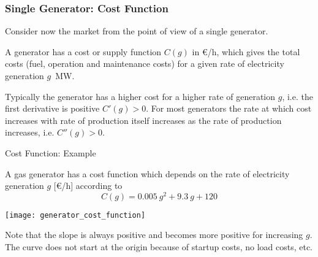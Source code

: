 \documentclass[10pt,aspectratio=169,dvipsnames]{beamer}
\begin{document}
\begin{frame}
  \frametitle{Single Generator: Cost Function}

  Consider now the market from the point of view of a single generator.

  A generator has a \alert{cost or supply function} $C(g)$ in \euro/h,
  which gives the total costs (fuel, operation and maintenance costs) for a given
  rate of electricity generation $g$~MW.

  Typically the generator has a higher cost for a higher rate of generation $g$,
  i.e. the first derivative is positive $C'(g) > 0$. For most generators the rate at which cost increases with rate of production itself increases as the rate of production increases, i.e. $C''(g) > 0$.

\end{frame}


\begin{frame}{Cost Function: Example}


  A gas generator has a cost function which depends on the
  rate of electricity generation $g$ [\euro/h] according to
  \begin{equation*}
    C(g) = 0.005~g^2  + 9.3~g + 120
  \end{equation*}


  \centering
  \texttt{[image: generator\_cost\_function]}

  \raggedright
  Note that the slope is always positive and becomes more positive
  for increasing $g$. The curve does not start at the origin because of startup costs, no load costs, etc.
\end{frame}
\end{document}
